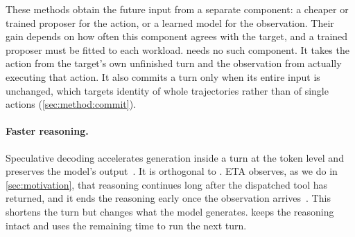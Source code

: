 These methods obtain the future input from a separate component: a cheaper or trained proposer for the action, or a learned model for the observation.
Their gain depends on how often this component agrees with the target, and a trained proposer must be fitted to each workload.
\method needs no such component.
It takes the action from the target's own unfinished turn and the observation from actually executing that action.
It also commits a turn only when its entire input is unchanged, which targets identity of whole trajectories rather than of single actions (\cref{sec:method:commit}).

\paragraph{Faster reasoning.}
Speculative decoding accelerates generation inside a turn at the token level and preserves the model's output~\citep{leviathan2023fast,chen2023accelerating}.
It is orthogonal to \method.
ETA observes, as we do in \cref{sec:motivation}, that reasoning continues long after the dispatched tool has returned, and it ends the reasoning early once the observation arrives~\citep{anon2026eta}.
This shortens the turn but changes what the model generates.
\method keeps the reasoning intact and uses the remaining time to run the next turn.

